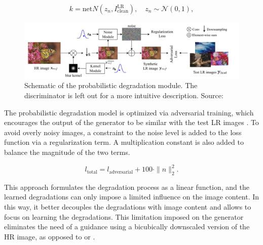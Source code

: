     \begin{equation}
        k = \text{net}N(z_n,I^{\text{LR}}_{\text{clean}}), \quad z_n \sim \mathcal{N}(0,1),
    \end{equation}

    \begin{figure}[h!]
        \centering
        \includegraphics[width=\textwidth]{Includes/3-probabilistic-degradation-model.png}
        \caption{Schematic of the probabilistic degradation module.
                The discriminator is left out for a more intuitive description. Source: \cite{luo2022learning}}
        \label{fig:3-probabilistic-degradation-model}
    \end{figure}

    The probabilistic degradation model is optimized via adversarial training, which encourages the output of the generator to be similar with the test LR images \cite{bulat2018learn}.
    To avoid overly noisy images, a constraint to the noise level is added to the loss function via a regularization term. 
    A multiplication constant is also added to balance the magnitude of the two terms.

    \begin{equation}
        l_{\text{total}} = l_{\text{adversarial}} + 100 \cdot \|n\|_2^2.
    \end{equation}

    This approach formulates the degradation process as a linear function, and the learned degradations can only impose a limited influence on the image content.
    In this way, it better decouples the degradations with image content and allows to focus on learning the degradations.
    This limitation imposed on the generator eliminates the need of a guidance using a bicubically downscaled version of the HR image, as opposed to \cite{wei2020unsupervised} or \cite{bulat2018learn}.

